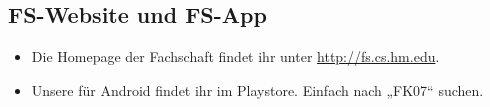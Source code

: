 \subsection{FS-Website und FS-App}
\begin{itemize}
	\item Die Homepage der Fachschaft findet ihr unter \url{http://fs.cs.hm.edu}.
	\item Unsere  für Android findet ihr im Playstore. 
	Einfach nach „FK07“ suchen.
\end{itemize}


